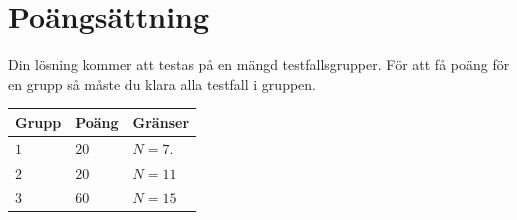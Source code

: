 \section*{Poängsättning}
Din lösning kommer att testas på en mängd testfallsgrupper.
För att få poäng för en grupp så måste du klara alla testfall i gruppen.

\noindent
\begin{tabular}{| l | l | p{12cm} |}
  \hline
  \textbf{Grupp} & \textbf{Poäng} & \textbf{Gränser} \\ \hline
  $1$    & $20$       & $N=7$. \\ \hline
  $2$    & $20$       & $N=11$ \\ \hline
  $3$    & $60$       & $N=15$ \\ \hline
\end{tabular}


